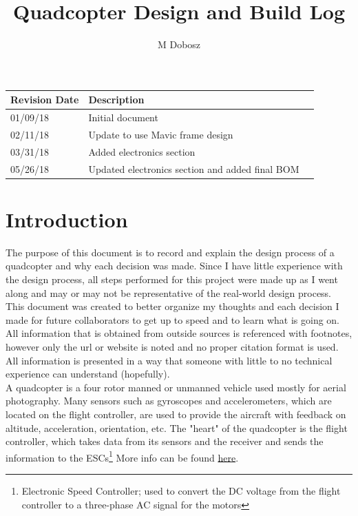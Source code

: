 \documentclass[12pt]{article}
\title{Quadcopter Design and Build Log}
\author{M Dobosz}
\begin{document}
\begin{titlepage}
\vspace*{-4.5cm}
\hspace*{-4.1cm}
{\let\newpage\relax\maketitle}

\begin{table}[b]
\begin{center}
\begin{tabular}{| l | l | l |}
\hline
\textbf{Revision Date} & \textbf{Description} \\ \hline
01/09/18 & Initial document \\ \hline
02/11/18 & Update to use Mavic frame design \\ \hline
03/31/18 & Added electronics section \\ \hline
05/26/18 & Updated electronics section and added final BOM \\ \hline
\end{tabular}
\end{center}
\end{table}
\end{titlepage}


\pagebreak
\tableofcontents
\pagebreak

\section{Introduction}

The purpose of this document is to record and explain the design process of a quadcopter and why each decision was made. Since I have little experience with the design process, all steps performed for this project were made up as I went along and may or may not be representative of the real-world design process. This document was created to better organize my thoughts and each decision I made for future collaborators to get up to speed and to learn what is going on. All information that is obtained from outside sources is referenced with footnotes, however only the url or website is noted and no proper citation format is used. All information is presented in a way that someone with little to no technical experience can understand (hopefully).
\\

A quadcopter is a four rotor manned or unmanned vehicle used mostly for aerial photography. Many sensors such as gyroscopes and accelerometers, which are located on the flight controller, are used to provide the aircraft with feedback on altitude, acceleration, orientation, etc. The "heart" of the quadcopter is the flight controller, which takes data from its sensors and the receiver and sends the information to the ESCs\footnote{Electronic Speed Controller; used to convert the DC voltage from the flight controller to a three-phase AC signal for the motors} More info can be found \href{https://en.wikipedia.org/wiki/Quadcopter}{\color{cyan}here}.
\\
\end{document}
